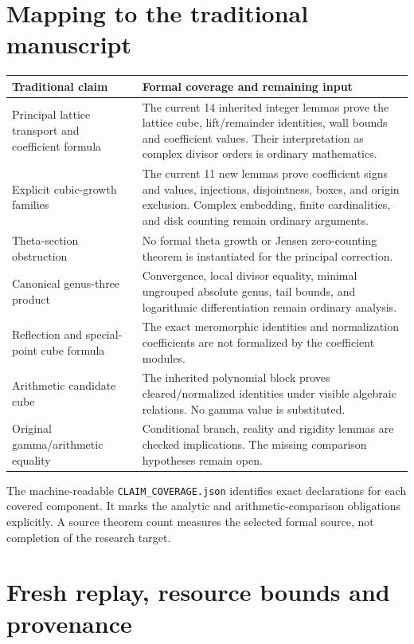 \documentclass[11pt]{article}
\newcommand{\decl}[1]{\nolinkurl{#1}}
\begin{document}
\section{Mapping to the traditional manuscript}

\begin{longtable}{@{}p{}p{}@{}}
\toprule
Traditional claim & Formal coverage and remaining input\\
\midrule
\endhead
Principal lattice transport and coefficient formula & The current 14 inherited integer lemmas prove the lattice cube, lift/remainder identities, wall bounds and coefficient values. Their interpretation as complex divisor orders is ordinary mathematics.\\[5pt]
Explicit cubic-growth families & The current 11 new lemmas prove coefficient signs and values, injections, disjointness, boxes, and origin exclusion. Complex embedding, finite cardinalities, and disk counting remain ordinary arguments.\\[5pt]
Theta-section obstruction & No formal theta growth or Jensen zero-counting theorem is instantiated for the principal correction.\\[5pt]
Canonical genus-three product & Convergence, local divisor equality, minimal ungrouped absolute genus, tail bounds, and logarithmic differentiation remain ordinary analysis.\\[5pt]
Reflection and special-point cube formula & The exact meromorphic identities and normalization coefficients are not formalized by the coefficient modules.\\[5pt]
Arithmetic candidate cube & The inherited polynomial block proves cleared/normalized identities under visible algebraic relations. No gamma value is substituted.\\[5pt]
Original gamma/arithmetic equality & Conditional branch, reality and rigidity lemmas are checked implications. The missing comparison hypotheses remain open.\\
\bottomrule
\end{longtable}

The machine-readable \decl{CLAIM_COVERAGE.json} identifies exact declarations for each covered component. It marks the analytic and arithmetic-comparison obligations explicitly. A source theorem count measures the selected formal source, not completion of the research target.

\clearpage
\section{Fresh replay, resource bounds and provenance}
\end{document}
